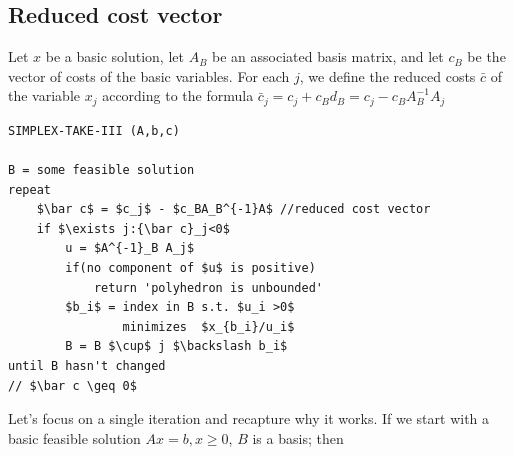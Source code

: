 \subsection{Reduced cost vector}
\begin{Def}
 Let $x$ be a basic solution, let $A_B$ be an associated basis matrix, and let $c_B$ be the vector of costs of the basic variables. For each $j$, we define the reduced costs $\bar c$ of the variable $x_j$ according to the formula 
$\bar c_j = c_j + c_Bd_B = c_j - c_B A^{-1}_B A_j$
\end{Def}


\begin{center}
\begin{lstlisting}
SIMPLEX-TAKE-III (A,b,c)

B = some feasible solution
repeat
    $\bar c$ = $c_j$ - $c_BA_B^{-1}A$ //reduced cost vector
    if $\exists j:{\bar c}_j<0$ 
        u = $A^{-1}_B A_j$ 
        if(no component of $u$ is positive)
            return 'polyhedron is unbounded'
        $b_i$ = index in B s.t. $u_i >0$ 
                minimizes  $x_{b_i}/u_i$
        B = B $\cup$ j $\backslash b_i$ 
until B hasn't changed 
// $\bar c \geq 0$ 
\end{lstlisting}
\end{center}


Let's focus on a single iteration and recapture why it works. If we start with a basic feasible solution $Ax=b, x\geq 0$, $B$ is a basis; then 

